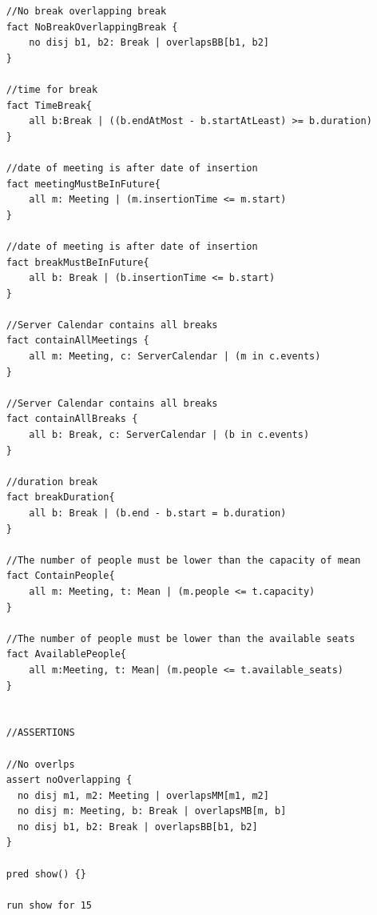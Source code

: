 \documentclass{article}
\begin{document}
\begin{lstlisting}
	//No break overlapping break
	fact NoBreakOverlappingBreak {
		no disj b1, b2: Break | overlapsBB[b1, b2]
	}

	//time for break
	fact TimeBreak{
		all b:Break | ((b.endAtMost - b.startAtLeast) >= b.duration)
	}

	//date of meeting is after date of insertion
	fact meetingMustBeInFuture{
		all m: Meeting | (m.insertionTime <= m.start)
	}

	//date of meeting is after date of insertion
	fact breakMustBeInFuture{
		all b: Break | (b.insertionTime <= b.start)
	}

	//Server Calendar contains all breaks
	fact containAllMeetings {
		all m: Meeting, c: ServerCalendar | (m in c.events)
	}

	//Server Calendar contains all breaks
	fact containAllBreaks {
		all b: Break, c: ServerCalendar | (b in c.events)
	}

	//duration break
	fact breakDuration{
		all b: Break | (b.end - b.start = b.duration)
	}

	//The number of people must be lower than the capacity of mean
	fact ContainPeople{
		all m: Meeting, t: Mean | (m.people <= t.capacity)
	}

	//The number of people must be lower than the available seats
	fact AvailablePeople{
		all m:Meeting, t: Mean| (m.people <= t.available_seats)
	}


	//ASSERTIONS

	//No overlps
	assert noOverlapping {
	  no disj m1, m2: Meeting | overlapsMM[m1, m2]
	  no disj m: Meeting, b: Break | overlapsMB[m, b]
	  no disj b1, b2: Break | overlapsBB[b1, b2]
	}

	pred show() {}

	run show for 15


	\end{lstlisting}
\end{document}
